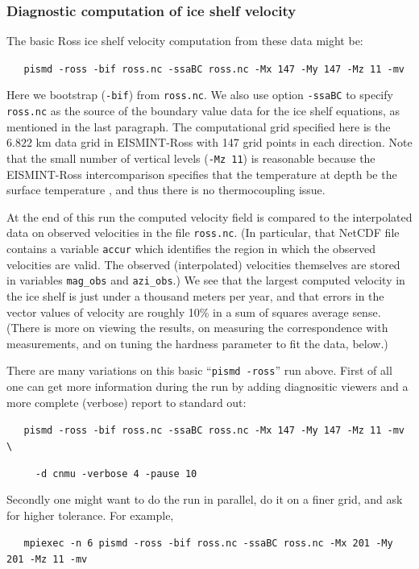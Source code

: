 \documentclass[11pt,final]{amsart}
\begin{document}
\subsubsection{Diagnostic computation of ice shelf velocity}  The basic Ross ice shelf velocity computation from these data might be:

\verb|   pismd -ross -bif ross.nc -ssaBC ross.nc -Mx 147 -My 147 -Mz 11 -mv|

\noindent Here we bootstrap (\verb|-bif|) from \verb|ross.nc|.  We also use option \verb|-ssaBC| to specify \verb|ross.nc| as the source of the boundary value data for the ice shelf equations, as mentioned in the last paragraph.  The computational grid specified here is the $6.822$ km data grid in EISMINT-Ross with 147 grid points in each direction.  Note that the small number of vertical levels (\verb|-Mz 11|) is reasonable because the EISMINT-Ross intercomparison specifies that the temperature at depth be the surface temperature \cite{MacAyealetal}, and thus there is no thermocoupling issue.

At the end of this run the computed velocity field is compared to the interpolated data on observed velocities in the file \verb|ross.nc|.  (In particular, that NetCDF file contains a variable \verb|accur| which identifies the region in which the observed velocities are valid.  The observed (interpolated) velocities themselves are stored in variables \verb|mag_obs| and \verb|azi_obs|.)  We see that the largest computed velocity in the ice shelf is just under a thousand meters per year, and that errors in the vector values of velocity are roughly 10\% in a sum of squares average sense.  (There is more on viewing the results, on measuring the correspondence with measurements, and on tuning the hardness parameter to fit the data, below.)

There are many variations on this basic ``\verb|pismd -ross|'' run above.  First of all one can get more information during the run by adding diagnositic viewers and a more complete (verbose) report to standard out:

\verb|   pismd -ross -bif ross.nc -ssaBC ross.nc -Mx 147 -My 147 -Mz 11 -mv \|

\verb|     -d cnmu -verbose 4 -pause 10|

\noindent Secondly one might want to do the run in parallel, do it on a finer grid, and ask for higher tolerance.  For example, 

\small
\verb|   mpiexec -n 6 pismd -ross -bif ross.nc -ssaBC ross.nc -Mx 201 -My 201 -Mz 11 -mv|
\normalsize
\end{document}
